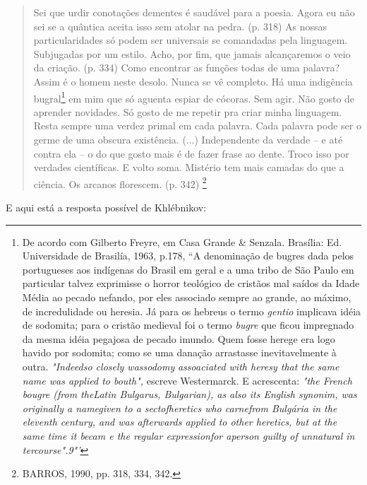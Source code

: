 \begin{quote}
Sei que urdir conotações dementes é saudável para a poesia. Agora eu não
sei se a quântica aceita isso sem atolar na pedra. (p. 318) As nossas
particularidades só podem ser universais se comandadas pela linguagem.
Subjugadas por um estilo. Acho, por fim, que jamais alcançaremos o veio
da criação. (p. 334) Como encontrar as funções todas de uma palavra?
Assim é o homem neste desolo. Nunca se vê completo. Há uma indigência
bugral\footnote{De acordo com Gilberto Freyre, em Casa Grande \&
  Senzala. Brasília: Ed. Universidade de Brasilía, 1963, p.178, ``A
  denominação de bugres dada pelos portugueses aos indígenas do Brasil
  em geral e a uma tribo de São Paulo em particular talvez exprimisse o
  horror teológico de cristãos mal saídos da Idade Média ao pecado
  nefando, por eles associado sempre ao grande, ao máximo, de
  incredulidade ou heresia. Já para os hebreus o termo \emph{gentio}
  implicava idéia de sodomita; para o cristão medieval foi o termo
  \emph{bugre} que ficou impregnado da mesma idéia pegajosa de pecado
  imundo. Quem fosse herege era logo havido por sodomita; como se uma
  danação arrastasse inevitavelmente à outra. \emph{"Indeedso closely
  wassodomy} \emph{assoaciated with heresy that the same name was
  applied to bouth",} escreve Westermarck. E acrescenta: \emph{"the
  French bougre (from theLatin Bulgarus, Bulgarian), as also its English
  synonim, was originally a namegiven to a sectofheretics who carnefrom
  Bulgária in the eleventh century, and was afterwards applied to other
  heretics, but at the same time it becam e the regular expressionfor
  aperson guilty of unnatural in tercourse".9"'}} em mim que só aguenta
espiar de cócoras. Sem agir. Não gosto de aprender novidades. Só gosto
de me repetir pra criar minha linguagem. Resta sempre uma verdez primal
em cada palavra. Cada palavra pode ser o germe de uma obscura
existência. (...) Independente da verdade -- e até contra ela -- o do
que gosto mais é de fazer frase ao dente. Troco isso por verdades
científicas. E volto soma. Mistério tem mais camadas do que a ciência.
Os arcanos florescem. (p. 342) \footnote{BARROS, 1990, pp. 318, 334,
  342.}
\end{quote}

E aqui está a resposta possível de Khlébnikov:

